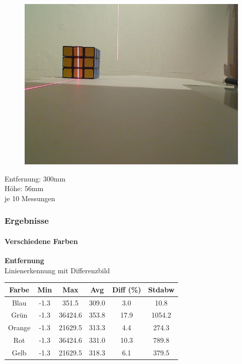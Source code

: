 \documentclass[xcolor=dvipsnames]{beamer}
\begin{document}
\begin{frame}
\begin{figure}
\begin{minipage}{0.32\linewidth}
		\end{minipage}
		\hfill
		\begin{minipage}{0.32\linewidth}
			\includegraphics[width=\linewidth]{includes/test_color_3}
		\end{minipage}
	\end{figure}
	
	Entfernung: 300mm\\
	Höhe: 56mm\\
	je 10 Messungen
	
\end{frame}
	
\begin{frame}
	\frametitle{Ergebnisse}
	\framesubtitle{Verschiedene Farben}
		\textbf{Entfernung}\\
		
		Linienerkennung mit Differenzbild
		\begin{tabular}{c|c|c|c|c|c}
			Farbe & Min & Max & Avg & Diff (\%) & Stdabw\\ \hline
Blau &-1.3 & 351.5 & 309.0 & 3.0 & 10.8\\
Grün &-1.3 & 36424.6 & 353.8 & 17.9 & 1054.2\\
Orange &-1.3 & 21629.5 & 313.3 & 4.4 & 274.3\\
Rot &-1.3 & 36424.6 & 331.0 & 10.3 & 789.8\\
Gelb &-1.3 & 21629.5 & 318.3 & 6.1 & 379.5\\
		\end{tabular}
		
\end{frame}
\end{document}
